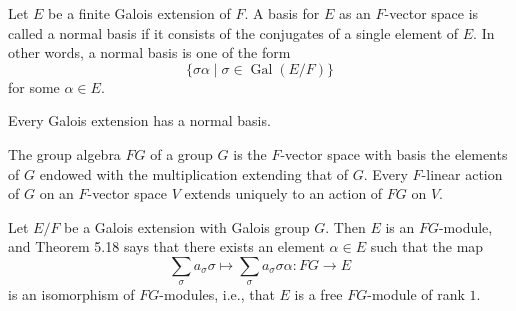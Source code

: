 \begin{definition}[5.17]
Let $E$ be a finite Galois extension of $F$. A basis for $E$ as an $F$-vector space is called a normal basis if it consists of the conjugates of a single element of $E$. In other words, a normal basis is one of the form
\[
\{\sigma\alpha\mid\sigma\in\operatorname{Gal}(E/F)\}
\]
for some $\alpha\in E$.
\end{definition}
\begin{theorem}
Every Galois extension has a normal basis.
\end{theorem}
The group algebra $FG$ of a group $G$ is the $F$-vector space with basis the elements of $G$ endowed with the multiplication extending that of $G$. Every $F$-linear action of $G$ on an $F$-vector space $V$ extends uniquely to an action of $FG$ on $V$.

Let $E/F$ be a Galois extension with Galois group $G$. Then $E$ is an $FG$-module, and Theorem 5.18 says that there exists an element $\alpha\in E$ such that the map
\[
\sum_{\sigma}a_\sigma\sigma\longmapsto\sum_{\sigma}a_\sigma\sigma\alpha:FG\longrightarrow E
\]
is an isomorphism of $FG$-modules, i.e., that $E$ is a free $FG$-module of rank $1$.

